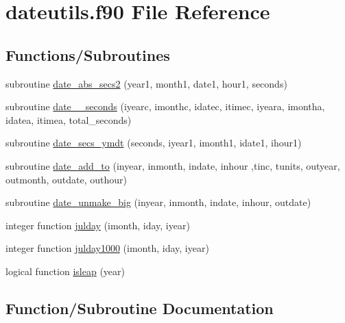 \hypertarget{dateutils_8f90}{}\section{dateutils.\+f90 File Reference}
\label{dateutils_8f90}
\subsection*{Functions/\+Subroutines}
\begin{DoxyCompactItemize}
\item 
subroutine \hyperlink{dateutils_8f90_a56423cc8c95e08c48faaadf0ae9a2100}{date\+\_\+abs\+\_\+secs2} (year1, month1, date1, hour1, seconds)
\item 
subroutine \hyperlink{dateutils_8f90_a6e1601cbd2ee1d2c2aae57cf1a9cba68}{date\+\_\+\_\+seconds} (iyearc, imonthc, idatec, itimec,           iyeara, imontha, idatea, itimea, total\+\_\+seconds)
\item 
subroutine \hyperlink{dateutils_8f90_abd0aaee09a0949cfef32003dae34f41d}{date\+\_\+secs\+\_\+ymdt} (seconds, iyear1, imonth1, idate1, ihour1)
\item 
subroutine \hyperlink{dateutils_8f90_a058d13b6be70177c02578d5e989fa8e9}{date\+\_\+add\+\_\+to} (inyear, inmonth, indate, inhour                                                                                               ,tinc, tunits, outyear, outmonth, outdate, outhour)
\item 
subroutine \hyperlink{dateutils_8f90_a151300a087ebed5a3efb44a63988654c}{date\+\_\+unmake\+\_\+big} (inyear, inmonth, indate, inhour, outdate)
\item 
integer function \hyperlink{dateutils_8f90_ab4306c1f20ef02cf582fb1050fa0c5d9}{julday} (imonth, iday, iyear)
\item 
integer function \hyperlink{dateutils_8f90_a9e268003476faf6e3551f0b04714231a}{julday1000} (imonth, iday, iyear)
\item 
logical function \hyperlink{dateutils_8f90_acbfdb1c78beb593447108203011b380c}{isleap} (year)
\end{DoxyCompactItemize}


\subsection{Function/\+Subroutine Documentation}

